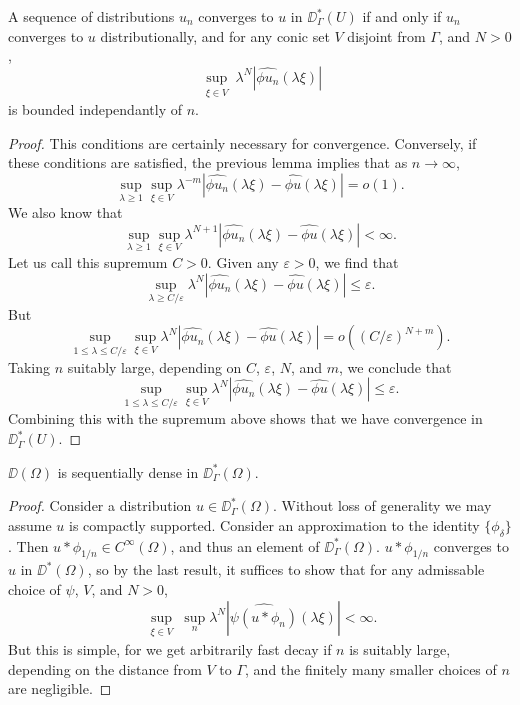\begin{theorem}
    A sequence of distributions $u_n$ converges to $u$ in $\DD^*_\Gamma(U)$ if and only if $u_n$ converges to $u$ distributionally, and for any conic set $V$ disjoint from $\Gamma$, and $N > 0$,
    \[ \sup_{\substack{\xi \in V}} \lambda^N |\widehat{\phi u_n}(\lambda \xi)| \]
    is bounded independantly of $n$.
\end{theorem}
\begin{proof}
    This conditions are certainly necessary for convergence. Conversely, if these conditions are satisfied, the previous lemma implies that as $n \to \infty$,
    \[ \sup_{\lambda \geq 1} \sup_{\xi \in V} \lambda^{-m} |\widehat{\phi u_n}(\lambda \xi) - \widehat{\phi u}(\lambda \xi)| = o(1). \]
    We also know that
    \[ \sup_{\lambda \geq 1} \sup_{\xi \in V} \lambda^{N+1} |\widehat{\phi u_n}(\lambda \xi) - \widehat{\phi u}(\lambda \xi)| < \infty. \]
    Let us call this supremum $C > 0$. Given any $\varepsilon > 0$, we find that
    \[ \sup_{\lambda \geq C/\varepsilon} \lambda^N |\widehat{\phi u_n}(\lambda \xi) - \widehat{\phi u}(\lambda \xi)| \leq \varepsilon. \]
    But
    \[ \sup_{1 \leq \lambda \leq C/\varepsilon} \sup_{\xi \in V} \lambda^N |\widehat{\phi u_n}(\lambda \xi) - \widehat{\phi u}(\lambda \xi)| = o((C/\varepsilon)^{N+m}). \]
    Taking $n$ suitably large, depending on $C$, $\varepsilon$, $N$, and $m$, we conclude that
    \[ \sup_{1 \leq \lambda \leq C/\varepsilon} \sup_{\xi \in V} \lambda^N |\widehat{\phi u_n}(\lambda \xi) - \widehat{\phi u}(\lambda \xi)| \leq \varepsilon. \]
    Combining this with the supremum above shows that we have convergence in $\DD^*_\Gamma(U)$.
\end{proof}

\begin{theorem}
    $\DD(\Omega)$ is sequentially dense in $\DD^*_\Gamma(\Omega)$.
\end{theorem}
\begin{proof}
    Consider a distribution $u \in \DD^*_\Gamma(\Omega)$. Without loss of generality we may assume $u$ is compactly supported. Consider an approximation to the identity $\{ \phi_\delta \}$. Then $u * \phi_{1/n} \in C^\infty(\Omega)$, and thus an element of $\DD^*_\Gamma(\Omega)$. $u * \phi_{1/n}$ converges to $u$ in $\DD^*(\Omega)$, so by the last result, it suffices to show that for any admissable choice of $\psi$, $V$, and $N > 0$,
    \[ \sup_{\substack{\xi \in V}} \sup_n \lambda^N |\widehat{\psi (u * \phi_n)}(\lambda \xi)| < \infty. \]
    But this is simple, for we get arbitrarily fast decay if $n$ is suitably large, depending on the distance from $V$ to $\Gamma$, and the finitely many smaller choices of $n$ are negligible.
\end{proof}

